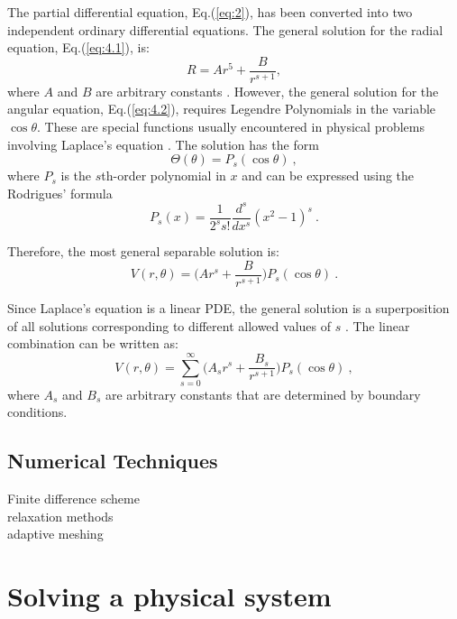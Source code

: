 \documentclass[a4paper]{jpconf}
\begin{document}
The partial differential equation, Eq.(\ref{eq:2}), has been converted into two independent ordinary differential equations. The general solution for the radial equation, Eq.(\ref{eq:4.1}), is:
\begin{equation}
R = Ar^5 + \frac{B}{r^{s+1}},
\end{equation} where $A$ and $B$ are arbitrary constants \cite{RHB-MathematicalMethods}. However, the general solution for the angular equation, Eq.(\ref{eq:4.2}), requires Legendre Polynomials in the variable $\cos \theta$. These are special functions usually encountered in physical problems involving Laplace's equation \cite{RHB-MathematicalMethods}. The solution has the form
\begin{equation}
\Theta(\theta) = P_{s}(\cos \theta)~,
\label{eq:5}
\end{equation} where $P_s$ is the $s$th-order polynomial in $x$ and can be expressed using the Rodrigues' formula \cite{RHB-MathematicalMethods}
\begin{equation}
P_s(x) = \frac{1}{2^s s!} \frac{d^s}{dx^s}(x^2 -1)^s~.
\label{eq:6}
\end{equation}

\noindent Therefore, the most general separable solution is:
\begin{equation}
V(r, \theta) = \bigg(A r^s + \frac{B}{r^{s+1}}\bigg) P_s (\cos \theta)~.
\label{eq:7}
\end{equation}  

\noindent Since Laplace's equation is a linear PDE, the general solution is a superposition of all solutions corresponding to different allowed values of $s$ \cite{griffiths-introElec}. The linear combination can be written as:
\begin{equation}
V(r, \theta) = \sum_{s=0}^{\infty} \bigg( A_s r^s + \frac{B_s}{r^{s+1}}\bigg) P_s (\cos \theta)~,
\label{eq:8}
\end{equation} where $A_s$ and $B_s$ are arbitrary constants that are determined by boundary conditions. \\ \par 

\subsection*{Numerical Techniques}
Finite difference scheme \\
relaxation methods \\
adaptive meshing


\section*{Solving a physical system}
\end{document}
